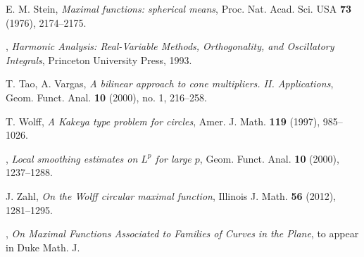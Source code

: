 \documentclass[10pt] %
{amsart}
\theoremstyle{plain}
\numberwithin{equation}{section}
\begin{document}
\begin{thebibliography}{}
	
 E. M. Stein, \textit{Maximal functions: spherical means},  Proc. Nat. Acad. Sci. USA {\bf 73} (1976), 2174--2175.

 \bysame, \textit{Harmonic Analysis: Real-Variable Methods, Orthogonality, and Oscillatory Integrals},  Princeton University Press, 1993.  

 T. Tao, A. Vargas, \textit{A bilinear approach to cone multipliers. II. Applications}, Geom. Funct.
Anal. {\bf 10} (2000), no. 1, 216--258.  

 T. Wolff, \textit{A Kakeya type problem for circles},  Amer. J. Math.  \textbf{119}  (1997),	985--1026.
	
 \bysame, \textit{Local smoothing estimates on $L^p$ for large $p$}, Geom. Funct. Anal. \textbf{10} (2000), 1237--1288.
		
 J. Zahl, \textit{On the Wolff circular maximal function}, Illinois J. Math. \textbf{56} (2012),  1281--1295.

 \bysame, \textit{On Maximal Functions Associated to Families of Curves in the Plane}, to appear in Duke Math. J. 

\end{thebibliography}
\end{document}
